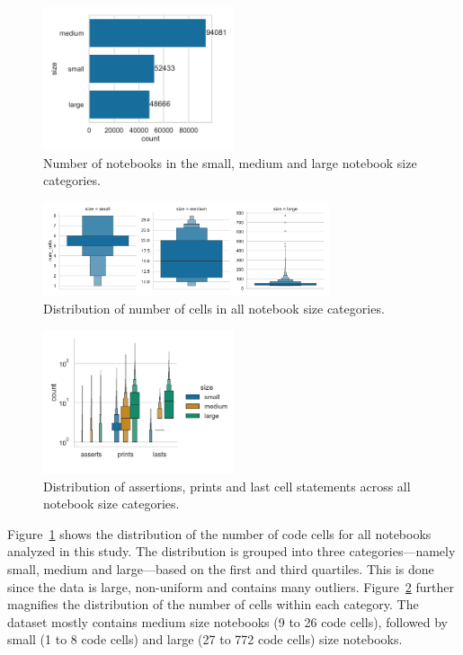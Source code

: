 \documentclass[smallextended]{svjour3}       %
\begin{document}
\begin{figure}
	\centering
	\includegraphics[width=0.5\textwidth]{notebook-size-distribution.pdf}
	\caption{Number of notebooks in the small, medium and large notebook size categories.}
	\label{fig:notebook-size-distribution}
\end{figure}

\begin{figure}
	\centering
	\includegraphics[width=0.75\textwidth]{cell-per-notebook-size-distribution.pdf}
	\caption{Distribution of number of cells in all notebook size categories.}
	\label{fig:cell-per-notebook-size-distribution}
\end{figure}

\begin{figure}
	\centering
	\includegraphics[width=0.5\textwidth]{fms-per-notebook-size-distribution.pdf}
	\caption{Distribution of assertions, prints and last cell statements across all notebook size categories.}
	\label{fig:fms-per-notebook-size-distribution}
\end{figure}

Figure~\ref{fig:notebook-size-distribution} shows the distribution of the number of code cells for all notebooks analyzed in this study. The distribution is grouped into three categories---namely small, medium and large---based on the first and third quartiles. This is done since the data is large, non-uniform and contains many outliers. Figure~\ref{fig:cell-per-notebook-size-distribution} further magnifies the distribution of the number of cells within each category. The dataset mostly contains medium size notebooks (9 to 26 code cells), followed by small (1 to 8 code cells) and large (27 to 772 code cells) size notebooks.
\end{document}
